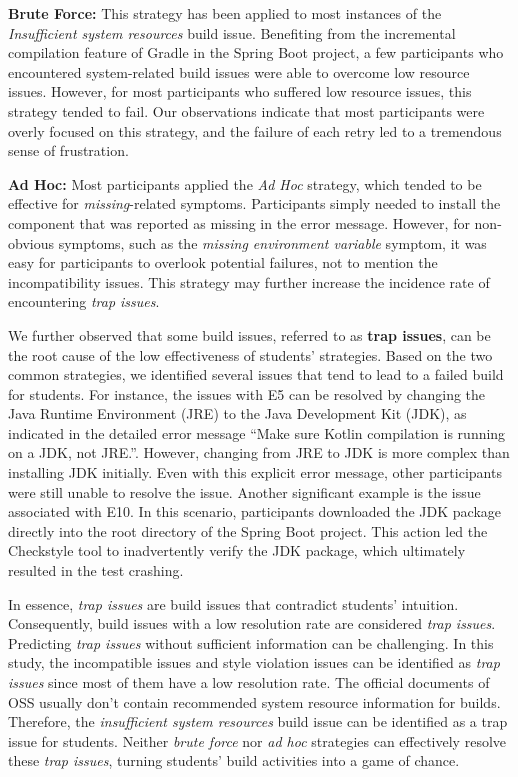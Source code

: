 \documentclass[10pt, conference]{IEEEtran}
\begin{document}
\textbf{Brute Force:} This strategy has been applied to most instances of the \textit{Insufficient system resources} build issue. Benefiting from the incremental compilation feature of Gradle in the Spring Boot project, a few participants who encountered system-related build issues were able to overcome low resource issues. However, for most participants who suffered low resource issues, this strategy tended to fail. Our observations indicate that most participants were overly focused on this strategy, and the failure of each retry led to a tremendous sense of frustration.

\textbf{Ad Hoc:} Most participants applied the \textit{Ad Hoc} strategy, which tended to be effective for \textit{missing}-related symptoms. Participants simply needed to install the component that was reported as missing in the error message. However, for non-obvious symptoms, such as the \textit{missing environment variable} symptom, it was easy for participants to overlook potential failures, not to mention the incompatibility issues. This strategy may further increase the incidence rate of encountering \textit{trap issues}.

We further observed that some build issues, referred to as \textbf{trap issues}, can be the root cause of the low effectiveness of students’ strategies. Based on the two common strategies, we identified several issues that tend to lead to a failed build for students. For instance, the issues with E5 can be resolved by changing the Java Runtime Environment (JRE) to the Java Development Kit (JDK), as indicated in the detailed error message ``Make sure Kotlin compilation is running on a JDK, not JRE.''. However, changing from JRE to JDK is more complex than installing JDK initially. Even with this explicit error message, other participants were still unable to resolve the issue. Another significant example is the issue associated with E10. In this scenario, participants downloaded the JDK package directly into the root directory of the Spring Boot project. This action led the Checkstyle tool to inadvertently verify the JDK package, which ultimately resulted in the test crashing.

In essence, \textit{trap issues} are build issues that contradict students’ intuition. Consequently, build issues with a low resolution rate are considered \textit{trap issues}. Predicting \textit{trap issues} without sufficient information can be challenging. In this study, the incompatible issues and style violation issues can be identified as \textit{trap issues} since most of them have a low resolution rate. The official documents of OSS usually don’t contain recommended system resource information for builds. Therefore, the \textit{insufficient system resources} build issue can be identified as a trap issue for students. Neither \textit{brute force} nor \textit{ad hoc} strategies can effectively resolve these \textit{trap issues}, turning students’ build activities into a game of chance.
\end{document}
